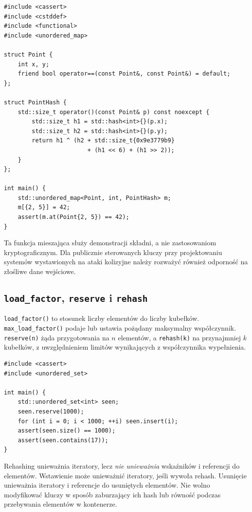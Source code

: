 \begin{lstlisting}[caption={Wlasny hash i porownanie kluczy (C++20); kompletny program.}]
#include <cassert>
#include <cstddef>
#include <functional>
#include <unordered_map>

struct Point {
    int x, y;
    friend bool operator==(const Point&, const Point&) = default;
};

struct PointHash {
    std::size_t operator()(const Point& p) const noexcept {
        std::size_t h1 = std::hash<int>{}(p.x);
        std::size_t h2 = std::hash<int>{}(p.y);
        return h1 ^ (h2 + std::size_t{0x9e3779b9}
                        + (h1 << 6) + (h1 >> 2));
    }
};

int main() {
    std::unordered_map<Point, int, PointHash> m;
    m[{2, 5}] = 42;
    assert(m.at(Point{2, 5}) == 42);
}
\end{lstlisting}

Ta funkcja mieszająca służy demonstracji składni, a nie zastosowaniom
kryptograficznym. Dla publicznie sterowanych kluczy przy projektowaniu
systemów wystawionych na ataki kolizyjne należy rozważyć również
odporność na złośliwe dane wejściowe.

\subsection{\texttt{load\_factor}, \texttt{reserve} i \texttt{rehash}}

\texttt{load\_factor()} to stosunek liczby elementów do liczby kubełków.
\texttt{max\_load\_factor()} podaje lub ustawia pożądany maksymalny
współczynnik. \texttt{reserve(n)} żąda przygotowania na $n$ elementów,
a \texttt{rehash(k)} na przynajmniej $k$ kubełków, z uwzględnieniem
limitów wynikających z współczynnika wypełnienia.

\begin{lstlisting}[caption={Rezerwowanie kubelek przed licznymi wstawkami (C++20); kompletny program.}]
#include <cassert>
#include <unordered_set>

int main() {
    std::unordered_set<int> seen;
    seen.reserve(1000);
    for (int i = 0; i < 1000; ++i) seen.insert(i);
    assert(seen.size() == 1000);
    assert(seen.contains(17));
}
\end{lstlisting}

Rehashing unieważnia iteratory, lecz \emph{nie unieważnia} wskaźników
i referencji do elementów. Wstawienie może unieważnić iteratory, jeśli
wywoła rehash. Usunięcie unieważnia iteratory i referencje do usuniętych
elementów. Nie wolno modyfikować kluczy w sposób zaburzający ich hash
lub równość podczas przebywania elementów w kontenerze.

